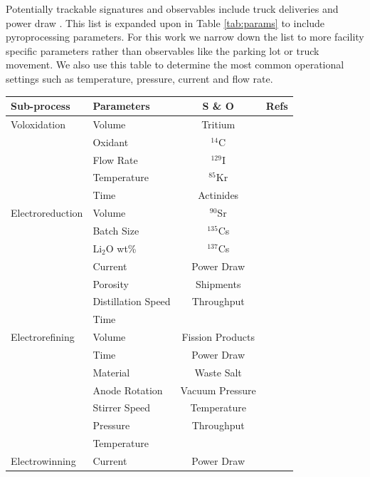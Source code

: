 Potentially trackable signatures and observables include truck deliveries and  power draw  \cite{Hou_2016,Yilmaz_2016}. This list is expanded upon in Table \ref{tab:params} to include pyroprocessing parameters. For this work we narrow down the list to more facility specific parameters rather than observables like the parking lot or truck movement. We also use this table
to determine the most common operational settings such as temperature, pressure, current and flow rate.

\begin{table}[h]
	\centering
	\begin{tabularx}{0.9\linewidth}{llcr}
		\hline
		\textbf{Sub-process} & \textbf{Parameters} & \textbf{S \& O} & \textbf{Refs} \\
		\hline
		Voloxidation & Volume & Tritium & \cite{jubin_spent_2009} \\
		& Oxidant & $^{14}$C & \cite{flowsheet_1998} \\
		& Flow Rate &  $^{129}$I &  \\
		& Temperature & $^{85}$Kr &  \\
		& Time & Actinides & \\ \hline
		Electroreduction & Volume & $^{90}$Sr & \cite{borrelli_approaches_2017} \\
		& Batch Size & $^{135}$Cs & \cite{flowsheet_1998} \\
		& Li$_2$O wt\% & $^{137}$Cs & \cite{choi_electrochemical_2015} \\
		& Current & Power Draw & \cite{lee_korean_2011} \\
		& Porosity & Shipments & \cite{lee_modeling_2016} \\
		& Distillation Speed & Throughput & \\ 
		& Time & & \\ \hline
		Electrorefining & Volume & Fission Products & \cite{lee_advanced_2008} \\
		& Time & Power Draw & \cite{lee_korean_2011} \\
		& Material & Waste Salt & \cite{flowsheet_1998} \\
		& Anode Rotation & Vacuum Pressure & \cite{koyama_development_2012} \\
		& Stirrer Speed & Temperature & \cite{kim_development_2013} \\
		& Pressure & Throughput & \\
		& Temperature & & \\ \hline
		Electrowinning & Current & Power Draw & \cite{flowsheet_1998} \\

\end{tabularx}
\end{table}
